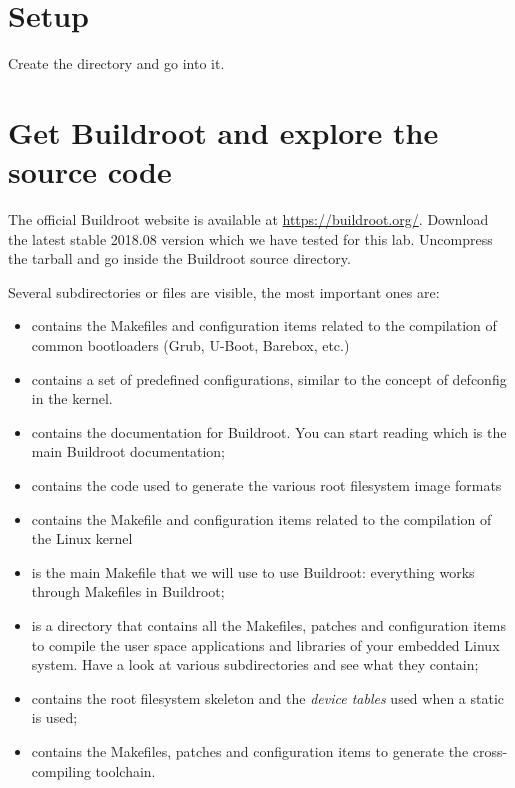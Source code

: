 
\section{Setup}

Create the  directory and
go into it.

\section{Get Buildroot and explore the source code}

The official Buildroot website is available at
\url{https://buildroot.org/}. Download the latest stable 2018.08
version which we have tested for this lab. Uncompress the tarball
and go inside the Buildroot source directory.

Several subdirectories or files are visible, the most important ones
are:

\begin{itemize}
\item {} contains the Makefiles and configuration items
  related to the compilation of common bootloaders (Grub, U-Boot,
  Barebox, etc.)
\item {} contains a set of predefined configurations,
  similar to the concept of defconfig in the kernel.
\item {} contains the documentation for Buildroot. You can
  start reading  which is the main Buildroot
  documentation;
\item {} contains the code used to generate the various root
  filesystem image formats
\item {} contains the Makefile and configuration items
  related to the compilation of the Linux kernel
\item {} is the main Makefile that we will use to use
  Buildroot: everything works through Makefiles in Buildroot;
\item {} is a directory that contains all the Makefiles,
  patches and configuration items to compile the user space
  applications and libraries of your embedded Linux system. Have a
  look at various subdirectories and see what they contain;
\item {} contains the root filesystem skeleton and the {\em
    device tables} used when a static  is used;
\item {} contains the Makefiles, patches and
  configuration items to generate the cross-compiling toolchain.
\end{itemize}

